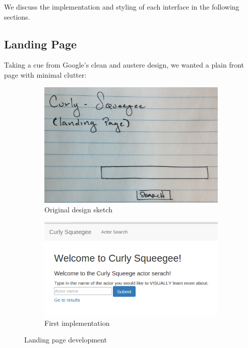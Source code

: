 \documentclass[12pt]{article}
\begin{document}
We discuss the implementation and styling of each interface in the following sections.

\subsection{Landing Page}

  Taking a cue from Google's clean and austere design, we wanted a plain front page with minimal clutter:
  
	\begin{figure}[h!]
		\centering
		\begin{subfigure}[t]{.5\textwidth}
			  \centering
			  \includegraphics[width=\linewidth]{images/landingPage_crop.png}
			  \caption{Original design sketch}
			  \label{fig:sub1}
		\end{subfigure}%
		\begin{subfigure}[t]{.8\textwidth}
			  \centering
			  \includegraphics[width=0.75\linewidth]{images/landingPage.png}
			  \caption{First implementation}
			  \label{fig:sub2}
		\end{subfigure}%
		\caption{Landing page development}
		\label{fig:landingPage}
	\end{figure}
\end{document}
